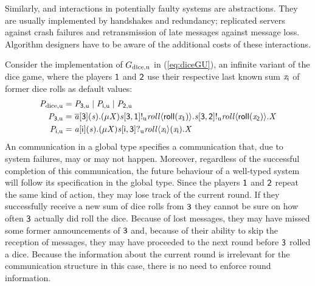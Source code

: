 Similarly, \strongR and \weakR interactions in potentially faulty systems are abstractions.
They are usually implemented by handshakes and redundancy; replicated servers against crash failures and retransmission of late messages against message loss.
Algorithm designers have to be aware of the additional costs of these interactions.

Consider the implementation of $ \GDiceUC $ in (\ref{eq:diceGU}), \ie an infinite variant of the dice game, where the players $ \Role[1] $ and $ \Role[2] $ use their respective last known sum $ \Args_{\Role[i]} $ of former dice rolls as default values:
\begin{align*}
	\PDiceUC ={}& \PPar{\PDiceDUC}{\PPar{\PDicePUC}{\PDiceQUC}}\\
	\PDiceDUC ={}& \PReq{\Chan[a]}{\Role[3]}{\Chan}{\PRep{\ProcV}{\PSendU{\Chan}{\Role[3]}{\Role[1]}{\Label[roll]}{\textsf{roll}(\Args_{\Role[1]})}{\PSendU{\Chan}{\Role[3]}{\Role[2]}{\Label[roll]}{\textsf{roll}(\Args_{\Role[2]})}{\ProcV}}}}\\
	\PDicePUC ={}& \PAcc{\Chan[a]}{\Role[i]}{\Chan}{\PRep{\ProcV}{\PGetU{\Chan}{\Role[i]}{\Role[3]}{\Label[roll]}{\Args_{\Role[i]}}{\Args_{\Role[i]}}{\ProcV}}}
\end{align*}
An \unrel communication in a global type specifies a communication that, due to system failures, may or may not happen.
Moreover, regardless of the successful completion of this \unrel communication, the future behaviour of a well-typed system will follow its specification in the global type.
Since the players $ \Role[1] $ and $ \Role[2] $ repeat the same kind of \unrel action, they may lose track of the current round.
If they successfully receive a new sum of dice rolls from $ \Role[3] $ they cannot be sure on how often $ \Role[3] $ actually did roll the dice.
Because of lost messages, they may have missed some former announcements of $ \Role[3] $ and, because of their ability to skip the reception of messages, they may have proceeded to the next round before $ \Role[3] $ rolled a dice.
Because the information about the current round is irrelevant for the communication structure in this case, there is no need to enforce round information.


